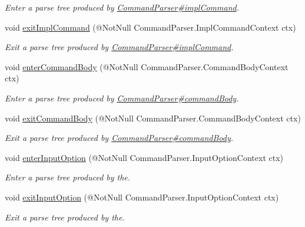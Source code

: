 \begin{DoxyCompactItemize}
\begin{DoxyCompactList}\small\item\em Enter a parse tree produced by \hyperlink{}{Command\+Parser\#impl\+Command}. \end{DoxyCompactList}\item 
void \hyperlink{interfaceedu_1_1udel_1_1cis_1_1vsl_1_1civl_1_1run_1_1common_1_1CommandListener_af7554078b9aa66a11935ed38353bc034}{exit\+Impl\+Command} (@Not\+Null Command\+Parser.\+Impl\+Command\+Context ctx)
\begin{DoxyCompactList}\small\item\em Exit a parse tree produced by \hyperlink{}{Command\+Parser\#impl\+Command}. \end{DoxyCompactList}\item 
void \hyperlink{interfaceedu_1_1udel_1_1cis_1_1vsl_1_1civl_1_1run_1_1common_1_1CommandListener_a91bf568a44219cd130cf9aa33676c8cb}{enter\+Command\+Body} (@Not\+Null Command\+Parser.\+Command\+Body\+Context ctx)
\begin{DoxyCompactList}\small\item\em Enter a parse tree produced by \hyperlink{}{Command\+Parser\#command\+Body}. \end{DoxyCompactList}\item 
void \hyperlink{interfaceedu_1_1udel_1_1cis_1_1vsl_1_1civl_1_1run_1_1common_1_1CommandListener_a6f9966dbecf5140f0da43ba349fcfc1c}{exit\+Command\+Body} (@Not\+Null Command\+Parser.\+Command\+Body\+Context ctx)
\begin{DoxyCompactList}\small\item\em Exit a parse tree produced by \hyperlink{}{Command\+Parser\#command\+Body}. \end{DoxyCompactList}\item 
void \hyperlink{interfaceedu_1_1udel_1_1cis_1_1vsl_1_1civl_1_1run_1_1common_1_1CommandListener_a06457e9f17498e9e41b28964d4834e64}{enter\+Input\+Option} (@Not\+Null Command\+Parser.\+Input\+Option\+Context ctx)
\begin{DoxyCompactList}\small\item\em Enter a parse tree produced by the. \end{DoxyCompactList}\item 
void \hyperlink{interfaceedu_1_1udel_1_1cis_1_1vsl_1_1civl_1_1run_1_1common_1_1CommandListener_a3b28747d2c3e4a7b43a93542e0513fbb}{exit\+Input\+Option} (@Not\+Null Command\+Parser.\+Input\+Option\+Context ctx)
\begin{DoxyCompactList}\small\item\em Exit a parse tree produced by the. \end{DoxyCompactList}\item 

\end{DoxyCompactItemize}
